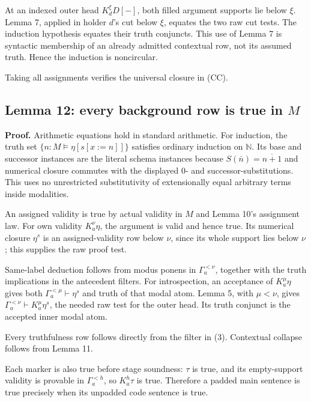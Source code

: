 \documentclass[
  11pt,
  letterpaper,
]{article}
\begin{document}
At an indexed outer head \(K_d^\xi D[-]\), both filled argument supports
lie below \(\xi\). Lemma 7, applied in holder \(d\)'s cut below \(\xi\),
equates the two raw cut tests. The induction hypothesis equates their
truth conjuncts. This use of Lemma 7 is syntactic membership of an
already admitted contextual row, not its assumed truth. Hence the
induction is noncircular.

Taking all assignments verifies the universal closure in (CC).

\subsection{\texorpdfstring{Lemma 12: every background row is true in
\(M\)}{Lemma 12: every background row is true in M}}\label{lemma-12-every-background-row-is-true-in-m}

\textbf{Proof.} Arithmetic equations hold in standard arithmetic. For
induction, the truth set \(\{n:M\models\eta[s[x:=n]]\}\) satisfies
ordinary induction on \(\mathbb N\). Its base and successor instances
are the literal schema instances because \(S(\bar n)=\overline{n+1}\)
and numerical closure commutes with the displayed \(0\)- and
successor-substitutions. This uses no unrestricted substitutivity of
extensionally equal arbitrary terms inside modalities.

An assigned validity is true by actual validity in \(M\) and Lemma 10's
assignment law. For own validity \(K_a^\nu\eta\), the argument is valid
and hence true. Its numerical closure \(\eta^s\) is an assigned-validity
row below \(\nu\), since its whole support lies below \(\nu\); this
supplies the raw proof test.

Same-label deduction follows from modus ponens in \(\Gamma_a^{<\nu}\),
together with the truth implications in the antecedent filters. For
introspection, an acceptance of \(K_a^\mu\eta\) gives both
\(\Gamma_a^{<\mu}\vdash\eta^s\) and truth of that modal atom. Lemma 5,
with \(\mu<\nu\), gives \(\Gamma_a^{<\nu}\vdash K_a^\mu\eta^s\), the
needed raw test for the outer head. Its truth conjunct is the accepted
inner modal atom.

Every truthfulness row follows directly from the filter in (3).
Contextual collapse follows from Lemma 11.

Each marker is also true before stage soundness: \(\tau\) is true, and
its empty-support validity is provable in \(\Gamma_a^{<h}\), so
\(K_a^h\tau\) is true. Therefore a padded main sentence is true
precisely when its unpadded code sentence is true.
\end{document}
